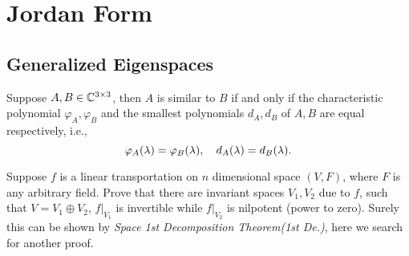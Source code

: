\chapter{Jordan Form}

\section{Generalized Eigenspaces}
\begin{pro}%
	Suppose $A,B\in\mathbb{C}^{3\times 3}$, then $A$ is similar to $B$ if and only if the characteristic polynomial $\varphi_A,\varphi_B$ and the smallest polynomials $d_A,d_B$ of $A,B$ are equal respectively, i.e.,
	\[\varphi_A(\lambda)=\varphi_B(\lambda),\quad d_A(\lambda)=d_B(\lambda).\]
\end{pro}

\begin{pro}[Fitting]%
	Suppose $f$ is a linear transportation on $n$ dimensional space $(V,F)$, where $F$ is any arbitrary field. Prove that there are invariant spaces $V_1,V_2$ due to $f$, such that $V=V_1\oplus V_2$, $f|_{V_1}$ is invertible while $f|_{V_2}$ is nilpotent (power to zero). Surely this can be shown by \emph{Space 1st Decomposition Theorem\;(1st De.)}, here we search for another proof.
\end{pro}

